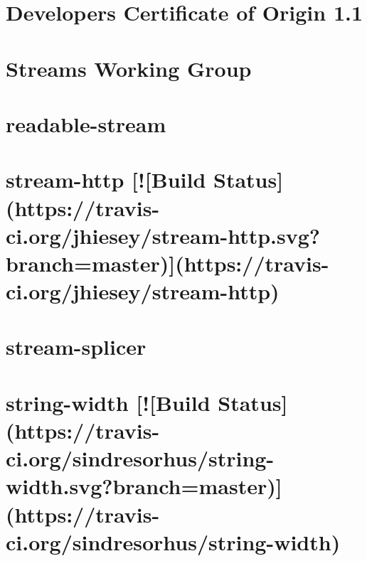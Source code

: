 \documentclass[twoside]{book}
\newcommand{\+}{\discretionary{\mbox{\scriptsize$\hookleftarrow$}}{}{}}
\begin{document}
\chapter{Developer\textquotesingle{}s Certificate of Origin 1.1}
\label{md_dsmacc_examples_DRmerge_node_modules_stream-http_node_modules_readable-stream_CONTRIBUTING}

\chapter{Streams Working Group}
\label{md_dsmacc_examples_DRmerge_node_modules_stream-http_node_modules_readable-stream_GOVERNANCE}

\chapter{readable-\/stream}
\label{md_dsmacc_examples_DRmerge_node_modules_stream-http_node_modules_readable-stream_README}

\chapter{stream-\/http \mbox{[}!\mbox{[}Build Status\mbox{]}(https\+://travis-\/ci.org/jhiesey/stream-\/http.svg?branch=master)\mbox{]}(https\+://travis-\/ci.org/jhiesey/stream-\/http)}
\label{md_dsmacc_examples_DRmerge_node_modules_stream-http_README}

\chapter{stream-\/splicer}
\label{md_dsmacc_examples_DRmerge_node_modules_stream-splicer_readme}

\chapter{string-\/width \mbox{[}!\mbox{[}Build Status\mbox{]}(https\+://travis-\/ci.org/sindresorhus/string-\/width.svg?branch=master)\mbox{]}(https\+://travis-\/ci.org/sindresorhus/string-\/width)}
\label{md_dsmacc_examples_DRmerge_node_modules_string-width_readme}

\end{document}
